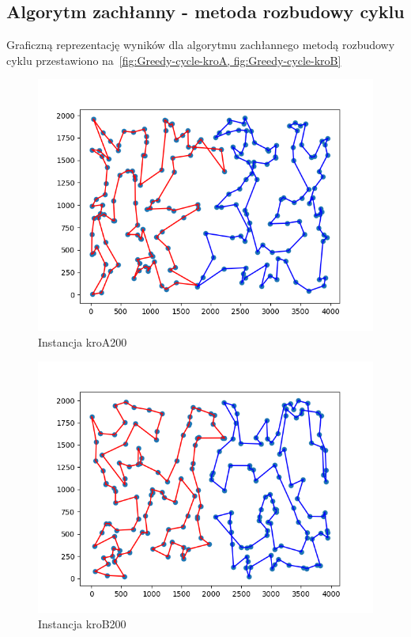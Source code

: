 \documentclass[11pt]{article}
\begin{document}
\subsection{Algorytm zachłanny - metoda rozbudowy cyklu}\label{subsec:algorytm-zachanny---metoda-rozbudowy-cyklu2}

Graficzną reprezentację wyników dla algorytmu zachłannego metodą rozbudowy cyklu przestawiono na~\ref{fig:Greedy-cycle-kroA, fig:Greedy-cycle-kroB}
\begin{figure}[H]
    \centering
    \includegraphics{best_paths/greedy_cheapest_insertion_kroA200.tsp}
    \caption{Instancja kroA200}
    \label{fig:Greedy-cycle-kroA}
\end{figure}
\begin{figure}[H]
    \centering
    \includegraphics{best_paths/greedy_cheapest_insertion_kroB200.tsp}
    \caption{Instancja kroB200}
    \label{fig:Greedy-cycle-kroB}
\end{figure}
\end{document}
